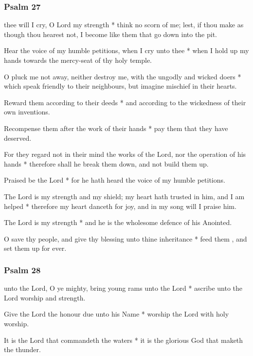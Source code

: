 \subsubsection{Psalm 27}


 thee will I cry, O Lord my strength * think no scorn of me; lest, if thou make as though thou hearest not, I become like them that go down into the pit.

Hear the voice of my humble petitions, when I cry unto thee * when I hold up my hands towards the mercy-seat of thy holy temple.

O pluck me not away, neither destroy me, with the ungodly and wicked doers * which speak friendly to their neighbours, but imagine mischief in their hearts.

Reward them according to their deeds * and according to the wickedness of their own inventions.

Recompense them after the work of their hands * pay them that they have deserved.

For they regard not in their mind the works of the Lord, nor the operation of his hands * therefore shall he break them down, and not build them up.

Praised be the Lord * for he hath heard the voice of my humble petitions.

The Lord is my strength and my shield; my heart hath trusted in him, and I am helped * therefore my heart danceth for joy, and in my song will I praise him.

The Lord is my strength * and he is the wholesome defence of his Anointed.

O save thy people, and give thy blessing unto thine inheritance * feed them , and set them up for ever.

\subsubsection{Psalm 28}


 unto the Lord, O ye mighty, bring young rams unto the Lord * ascribe unto the Lord worship and strength.

Give the Lord the honour due unto his Name * worship the Lord with holy worship.

It is the Lord that commandeth the waters * it is the glorious God that maketh the thunder.

